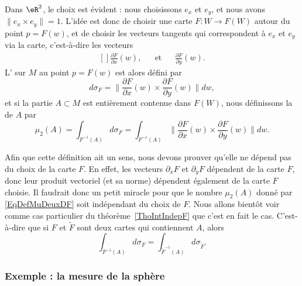 Dans \( \eR^2\), le choix est évident : nous choisissons \( e_x\) et \( e_y\), et nous avons \( \|e_x\times e_y\|=1\). L'idée est donc de choisir une carte \( F\colon W\to F(W)\) autour du point \( p=F(w)\), et de choisir les vecteurs tangents qui correspondent à \( e_x\) et \( e_y\) via la carte, c'est-à-dire les vecteurs
\begin{equation}
	\begin{aligned}[]
		\frac{ \partial F }{ \partial x }(w), &  & \text{et} &  & \frac{ \partial F }{ \partial y }(w).
	\end{aligned}
\end{equation}
L' sur \( M\) au point \( p=F(w)\) est alors défini par
\begin{equation}
	d\sigma_F=\|  \frac{ \partial F }{ \partial x }(w)\times\frac{ \partial F }{ \partial y }(w) \|dw,
\end{equation}
et si la partie \( A\subset M\) est entièrement contenue dans \( F(W)\), nous définissons la  de \( A\) par
\begin{equation}		\label{EqDefMuDeuxDF}
	\mu_2(A)=\int_{F^{-1}(A)}d\sigma_F=\int_{F^{-1}(A)}\| \frac{ \partial F }{ \partial x }(w)\times\frac{ \partial F }{ \partial y }(w) \|dw.
\end{equation}
\begin{remark}
	Afin que cette définition ait un sens, nous devons prouver qu'elle ne dépend pas du choix de la carte \( F\). En effet, les vecteurs \( \partial_xF\) et \( \partial_yF\) dépendent de la carte \( F\), donc leur produit vectoriel (et sa norme) dépendent également de la carte \( F\) choisie. Il faudrait donc un petit miracle pour que le nombre \( \mu_2(A)\) donné par \eqref{EqDefMuDeuxDF} soit indépendant du choix de \( F\).  Nous allons bientôt voir comme cas particulier du théorème~\ref{ThoIntIndepF} que c'est en fait le cas. C'est-à-dire que si \( F\) et \( \tilde F\) sont deux cartes qui contiennent \( A\), alors
	\begin{equation}
		\int_{F^{-1}(A)}d\sigma_F=\int_{\tilde F^{-1}(A)}d\sigma_{\tilde F}.
	\end{equation}
\end{remark}

\subsubsection{Exemple : la mesure de la sphère}

